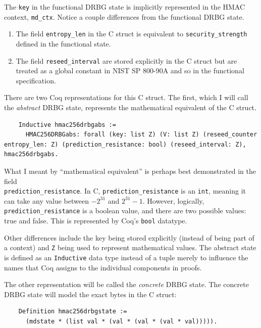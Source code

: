 \documentclass[pageno]{jpaper}
\begin{document}
The \lstinline{key} in the functional DRBG state is implicitly represented in the HMAC context, \lstinline{md_ctx}. Notice a couple differences from the functional DRBG state.


\begin{enumerate}
\item The field \lstinline{entropy_len} in the C struct is equivalent to \lstinline{security_strength} defined in the functional state.
\item The field \lstinline{reseed_interval} are stored explicitly in the C struct but are treated as a global constant in NIST SP 800-90A and so in the functional specification.
\end{enumerate}


There are two Coq representations for this C struct. The first, which I will call the \textit{abstract} DRBG state, represents the mathematical equivalent of the C struct.

\begin{lstlisting}
    Inductive hmac256drbgabs :=
      HMAC256DRBGabs: forall (key: list Z) (V: list Z) (reseed_counter entropy_len: Z) (prediction_resistance: bool) (reseed_interval: Z), hmac256drbgabs.
\end{lstlisting}

What I meant by “mathematical equivalent” is perhaps best demonstrated in the field \\ \lstinline{prediction_resistance}. In C, \lstinline{prediction_resistance} is an \lstinline{int}, meaning it can take any value between $-2^{31}$ and $2^{31} - 1$. However, logically, \lstinline{prediction_resistance} is a boolean value, and there are two possible values: true and false. This is represented by Coq’s \lstinline{bool} datatype.

Other differences include the key being stored explicitly (instead of being part of a context) and \lstinline{Z} being used to represent mathematical values. The abstract state is defined as an \lstinline{Inductive} data type instead of a tuple merely to influence the names that Coq assigns to the individual components in proofs.

The other representation will be called the \textit{concrete} DRBG state. The concrete DRBG state will model the exact bytes in the C struct:

\begin{lstlisting}
    Definition hmac256drbgstate :=
      (mdstate * (list val * (val * (val * (val * val))))).
\end{lstlisting}
\end{document}

